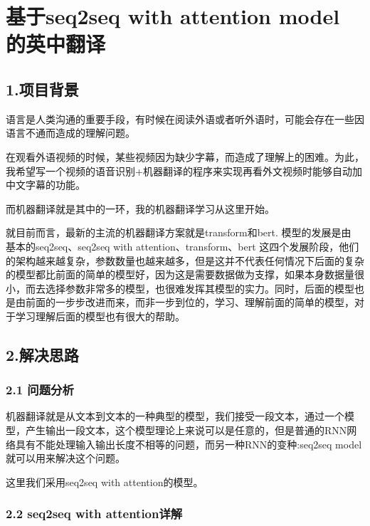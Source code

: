 \documentclass[
]{article}
\author{}
\date{}
\begin{document}
\hypertarget{header-n0}{%
\section{基于seq2seq with attention model 的英中翻译}\label{header-n0}}

\tableofcontents

\hypertarget{header-n8}{%
\subsection{1.项目背景}\label{header-n8}}

语言是人类沟通的重要手段，有时候在阅读外语或者听外语时，可能会存在一些因语言不通而造成的理解问题。

在观看外语视频的时候，某些视频因为缺少字幕，而造成了理解上的困难。为此，我希望写一个视频的语音识别+机器翻译的程序来实现再看外文视频时能够自动加中文字幕的功能。

而机器翻译就是其中的一环，我的机器翻译学习从这里开始。

就目前而言，最新的主流的机器翻译方案就是transform和bert. 模型的发展是由
基本的seq2seq、seq2seq with attention、transform、bert
这四个发展阶段，他们的架构越来越复杂，参数数量也越来越多，但是这并不代表任何情况下后面的复杂的模型都比前面的简单的模型好，因为这是需要数据做为支撑，如果本身数据量很小，而去选择参数非常多的模型，也很难发挥其模型的实力。同时，后面的模型也是由前面的一步步改进而来，而非一步到位的，学习、理解前面的简单的模型，对于学习理解后面的模型也有很大的帮助。

\hypertarget{header-n13}{%
\subsection{2.解决思路}\label{header-n13}}

\hypertarget{header-n14}{%
\subsubsection{2.1 问题分析}\label{header-n14}}

机器翻译就是从文本到文本的一种典型的模型，我们接受一段文本，通过一个模型，产生输出一段文本，这个模型理论上来说可以是任意的，但是普通的RNN网络具有不能处理输入输出长度不相等的问题，而另一种RNN的变种:seq2seq
model就可以用来解决这个问题。

这里我们采用seq2seq with attention的模型。

\hypertarget{header-n17}{%
\subsubsection{2.2 seq2seq with attention详解}\label{header-n17}}
\end{document}

